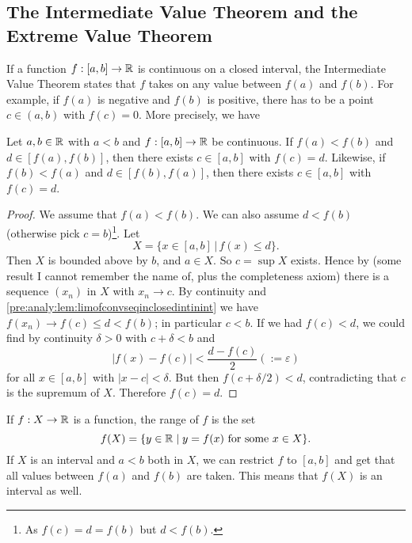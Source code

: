 \documentclass[10pt, a4paper]{article}
\begin{document}
\subsection{The Intermediate Value Theorem and the Extreme Value Theorem}

If a function $f : [a, b] \rightarrow \mathbb{R}$ is continuous on a closed interval,
the Intermediate Value Theorem states that $f$ takes on any value between $f(a)$ and $f(b)$.
For example,
if $f(a)$ is negative and $f(b)$ is positive,
there has to be a point $c \in (a, b)$ with $f(c) = 0$.
More precisely,
we have

\begin{theorem}
    Let $a, b \in \mathbb{R}$ with $a < b$ and $f : [a, b] \rightarrow \mathbb{R}$ be continuous.
    If $f(a) < f(b)$ and $d \in [f(a), f(b)]$,
    then there exists $c \in [a, b]$ with $f(c) = d$.
    Likewise,
    if $f(b) < f(a)$ and $d \in [f(b), f(a)]$,
    then there exists $c \in [a, b]$ with $f(c) = d$.

    \begin{proof}
        We assume that $f(a) < f(b)$.
        We can also assume $d < f(b)$
        (otherwise pick $c = b$)\footnote{As $f(c) = d = f(b)$ but $d < f(b)$.}.
        Let
        \[
        X = \{x \in [a, b]\,|\,f(x) \leq d\}.
        \]
        Then $X$ is bounded above by $b$,
        and $a \in X$.
        So $c = \sup{X}$ exists.
        Hence by
        (some result I cannot remember the name of,
        plus the completeness axiom)
        there is a sequence $(x_n)$ in $X$ with $x_n \rightarrow c$.
        By continuity and \autoref{pre:analy:lem:limofconvseqinclosedintinint} we have $f(x_n) \rightarrow f(c) \leq d < f(b)$;
        in particular $c < b$.
        If we had $f(c) < d$,
        we could find by continuity $\delta > 0$ with $c + \delta < b$ and
        \[
        |f(x) - f(c)| < \frac{d - f(c)}{2}(:= \varepsilon)
        \]
        for all $x \in [a, b]$ with $|x - c| < \delta$.
        But then $f(c + \delta / 2) < d$,
        contradicting that $c$ is the supremum of $X$.
        Therefore $f(c) = d$.
    \end{proof}
\end{theorem}

If $f : X \rightarrow \mathbb{R}$ is a function,
the range of $f$ is the set
\[
f(X) = \{y \in \mathbb{R}\mid y = f(x)\text{ for some } x \in X\}.
\]
If $X$ is an interval and $a < b$ both in $X$,
we can restrict $f$ to $[a, b]$ and get that all values between $f(a)$ and $f(b)$ are taken.
This means that $f(X)$ is an interval as well.
\end{document}
